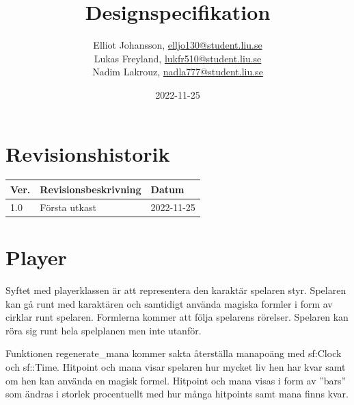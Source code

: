 \documentclass[12pt]{TDP005mall}
\author{Elliot Johansson, \url{elljo130@student.liu.se}\\
  Lukas Freyland, \url{lukfr510@student.liu.se}\\
  Nadim Lakrouz, \url{nadla777@student.liu.se}}
\title{Designspecifikation}
\date{2022-11-25}
\begin{document}
\projectpage
\section{Revisionshistorik}
\begin{table}[!h]
\begin{tabularx}{\linewidth}{|l|X|l|}
\hline
Ver. & Revisionsbeskrivning & Datum \\\hline

1.0 & Första utkast & 2022-11-25 \\\hline
\end{tabularx}
\end{table}

\section{Player}
Syftet med playerklassen är att representera den karaktär spelaren styr. Spelaren kan gå runt med karaktären och samtidigt använda magiska formler i form av cirklar runt spelaren. Formlerna kommer att följa spelarens rörelser. Spelaren kan röra sig runt hela spelplanen men inte utanför. 

Funktionen regenerate\_mana kommer sakta återställa manapoäng med sf:Clock och sf::Time. 
Hitpoint och mana visar spelaren hur mycket liv hen har kvar samt om hen kan använda en magisk formel.
Hitpoint och mana visas i form av ''bars'' som ändras i storlek procentuellt med hur många hitpoints samt mana finns kvar.


\subsection{}
\end{document}
